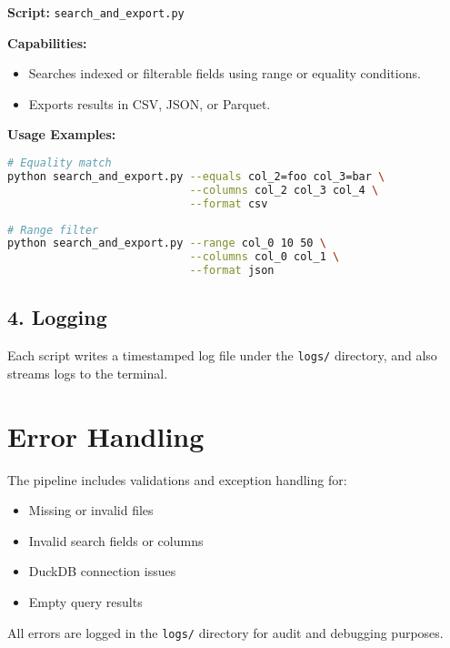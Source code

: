 \documentclass[a4paper,11pt]{article}
\begin{document}
\textbf{Script:} \texttt{search\_and\_export.py}

\begin{tcolorbox}[colback=purple!5, colframe=purple!40!black]
\textbf{Capabilities:}
\begin{itemize}[leftmargin=1em]
  \item Searches indexed or filterable fields using range or equality conditions.
  \item Exports results in CSV, JSON, or Parquet.
\end{itemize}
\end{tcolorbox}

\textbf{Usage Examples:}
\begin{lstlisting}[language=bash, caption=Equality Match Search]
# Equality match
python search_and_export.py --equals col_2=foo col_3=bar \
                            --columns col_2 col_3 col_4 \
                            --format csv
\end{lstlisting}

\begin{lstlisting}[language=bash, caption=Range Filter Search]
# Range filter
python search_and_export.py --range col_0 10 50 \
                            --columns col_0 col_1 \
                            --format json
\end{lstlisting}

\subsection{4. Logging}

\begin{tcolorbox}[colback=gray!10, colframe=gray!50!black, title=Logging System]
Each script writes a timestamped log file under the \texttt{logs/} directory, and also streams logs to the terminal.
\end{tcolorbox}

\section{Error Handling}

\begin{mdframed}[backgroundcolor=red!5, linecolor=red!40!black, linewidth=2pt]
The pipeline includes validations and exception handling for:
\begin{itemize}[leftmargin=1em]
  \item Missing or invalid files
  \item Invalid search fields or columns
  \item DuckDB connection issues
  \item Empty query results
\end{itemize}

All errors are logged in the \texttt{logs/} directory for audit and debugging purposes.
\end{mdframed}
\end{document}
